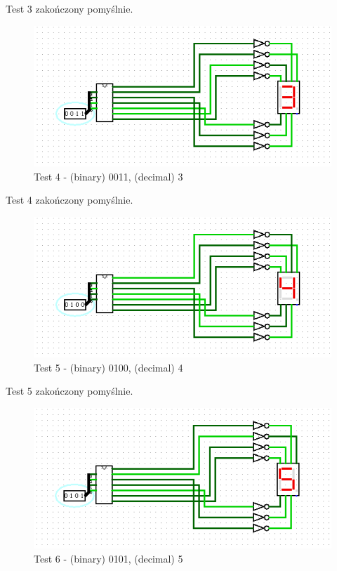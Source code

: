 Test 3 zakończony pomyślnie.

\begin{figure}[H]
    \includegraphics[width=\linewidth]{ScreenshotsTests/Comp 1/Comp 1_00006.png}
    \caption{Test 4 - (binary) 0011, (decimal) 3}
    \label{fig:test3}
\end{figure}

Test 4 zakończony pomyślnie.

\begin{figure}[H]
    \includegraphics[width=\linewidth]{ScreenshotsTests/Comp 1/Comp 1_00005.png}
    \caption{Test 5 - (binary) 0100, (decimal) 4}
    \label{fig:test4}
\end{figure}

Test 5 zakończony pomyślnie.

\begin{figure}[H]
    \includegraphics[width=\linewidth]{ScreenshotsTests/Comp 1/Comp 1_00004.png}
    \caption{Test 6 - (binary) 0101, (decimal) 5}
    \label{fig:test5}
\end{figure}

